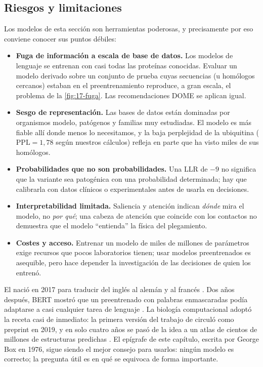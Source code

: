 \subsection{Riesgos y limitaciones}

Los modelos de esta sección son herramientas poderosas, y precisamente por eso conviene conocer sus puntos débiles:

\begin{itemize}
  \item \textbf{Fuga de información a escala de base de datos.} Los modelos de lenguaje se entrenan con casi todas las proteínas conocidas. Evaluar un modelo derivado sobre un conjunto de prueba cuyas secuencias (u homólogos cercanos) estaban en el preentrenamiento reproduce, a gran escala, el problema de la \cref{fig:17-fuga}. Las recomendaciones DOME \parencite{c17-walsh2021} se aplican igual.
  \item \textbf{Sesgo de representación.} Las bases de datos están dominadas por organismos modelo, patógenos y familias muy estudiadas. El modelo es más fiable allí donde menos lo necesitamos, y la baja perplejidad de la ubiquitina ($\mathrm{PPL}=1{,}78$ según nuestros cálculos) refleja en parte que ha visto miles de sus homólogos.
  \item \textbf{Probabilidades que no son probabilidades.} Una LLR de $-9$ no significa que la variante sea patogénica con una probabilidad determinada; hay que calibrarla con datos clínicos o experimentales antes de usarla en decisiones.
  \item \textbf{Interpretabilidad limitada.} Saliencia y atención indican \emph{dónde} mira el modelo, no \emph{por qué}; una cabeza de atención que coincide con los contactos no demuestra que el modelo ``entienda'' la física del plegamiento.
  \item \textbf{Costes y acceso.} Entrenar un modelo de miles de millones de parámetros exige recursos que pocos laboratorios tienen; usar modelos preentrenados es asequible, pero hace depender la investigación de las decisiones de quien los entrenó.
\end{itemize}

\begin{historia}
El  nació en 2017 para traducir del inglés al alemán y al francés \parencite{c17-vaswani2017}. Dos años después, BERT mostró que un  preentrenado con palabras enmascaradas podía adaptarse a casi cualquier tarea de lenguaje \parencite{c17-devlin2019}. La biología computacional adoptó la receta casi de inmediato: la primera versión del trabajo de \textcite{c17-rives2021} circuló como preprint en 2019, y en solo cuatro años se pasó de la idea a un atlas de cientos de millones de estructuras predichas \parencite{c17-lin2023}. El epígrafe de este capítulo, escrita por George Box en 1976, sigue siendo el mejor consejo para usarlos: ningún modelo es correcto; la pregunta útil es en qué se equivoca de forma importante.
\end{historia}

